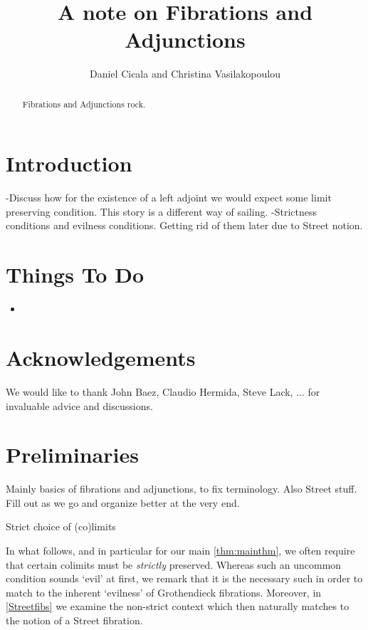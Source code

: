 \documentclass{amsart}
\begin{document}
\title{A note on Fibrations and Adjunctions}

\author{Daniel Cicala and Christina Vasilakopoulou} 
\address{Departement of Mathematics, University of California, Riverside, 900 University Avenue, 92521, USA}

\begin{abstract}
Fibrations and Adjunctions rock.
\end{abstract}

\maketitle

\tableofcontents


\section{Introduction}

-Discuss how for the existence of a left adjoint we would expect some limit preserving condition. This story is a different way of sailing.
-Strictness conditions and evilness conditions. Getting rid of them later due to Street notion.

\section*{Things To Do}
\begin{itemize}
\item 
\end{itemize}

\section*{Acknowledgements} We would like to thank John Baez, Claudio Hermida, Steve Lack, ... for invaluable advice and discussions.

\section{Preliminaries}\label{sec:preliminaries}

{\chris Mainly basics of fibrations and adjunctions, to fix terminology. Also Street stuff. Fill out as we go and organize better at the very end.
}

{\chris Strict choice of (co)limits}

In what follows, and in particular for our main \cref{thm:mainthm}, we often require that certain colimits must be \emph{strictly} preserved. Whereas such an uncommon condition sounds `evil' at first, we remark that it is the necessary such in order to match to the inherent `evilness' of Grothendieck fibrations. Moreover, in \cref{Streetfibs} we examine the non-strict context which then naturally matches to the notion of a Street fibration.
\end{document}
